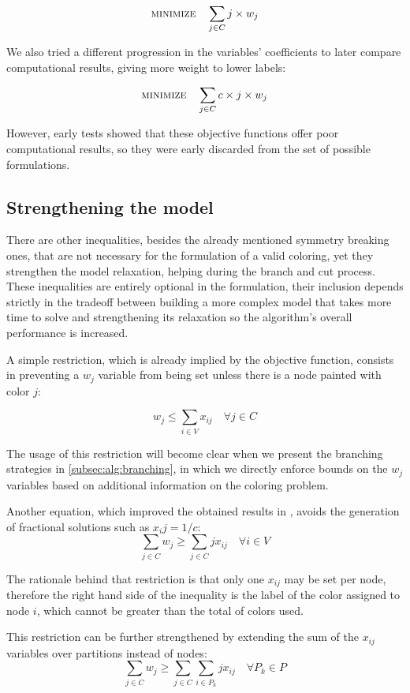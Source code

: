 \begin{equation}
\label{eqn:objlinear}
\text{\textsc{minimize}} \quad \sum_{j \in C} j \times w_j 
\end{equation}

We also tried a different progression in the variables' coefficients to later compare computational results, giving more weight to lower labels:

\begin{equation}
\label{eqn:objgeo}
\text{\textsc{minimize}} \quad \sum_{j \in C} c \times j \times w_j 
\end{equation}

However, early tests showed that these objective functions offer poor computational results, so they were early discarded from the set of possible formulations.

\subsection{Strengthening the model}

There are other inequalities, besides the already mentioned symmetry breaking ones, that are not necessary for the formulation of a valid coloring, yet they strengthen the model relaxation, helping during the branch and cut process. These inequalities are entirely optional in the formulation, their inclusion depends strictly in the tradeoff between building a more complex model that takes more time to solve and strengthening its relaxation so the algorithm's overall performance is increased.

A simple restriction, which is already implied by the objective function, consists in preventing a $w_j$ variable from being set unless there is a node painted with color $j$:

\begin{equation}
\label{eqn:wjleqsumcolor}
w_j \leq \sum_{i \in V} x_{ij} \quad \forall j \in C
\end{equation}

The usage of this restriction will become clear when we present the branching strategies in \ref{subsec:alg:branching}, in which we directly enforce bounds on the $w_j$ variables based on additional information on the coloring problem.

Another equation, which improved the obtained results in \cite{mendez2006branch}, avoids the generation of fractional solutions such as $x_ij = 1/c$:
\begin{equation}
\label{eqn:wjgeqsumnode}
\sum_{j \in C} w_j \geq \sum_{j \in C} j x_{ij} \quad \forall i \in V
\end{equation}

The rationale behind that restriction is that only one $x_{ij}$ may be set per node, therefore the right hand side of the inequality is the label of the color assigned to node $i$, which cannot be greater than the total of colors used.

This restriction can be further strengthened by extending the sum of the $x_{ij}$ variables over partitions instead of nodes:
\begin{equation}
\label{eqn:wjgeqsumpart}
\sum_{j \in C} w_j \geq \sum_{j \in C} \sum_{i \in P_k} j x_{ij} \quad \forall P_k \in P
\end{equation}
